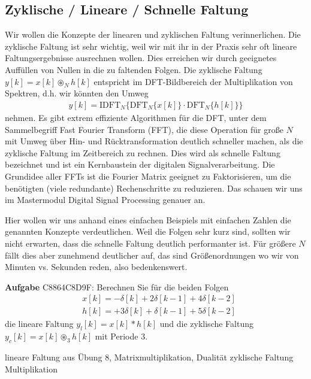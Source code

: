 \subsection{Zyklische / Lineare / Schnelle Faltung}
\label{sec:C8864C8D9F}
\begin{Ziel}
Wir wollen die Konzepte der linearen und zyklischen Faltung verinnerlichen.
Die zyklische Faltung ist sehr wichtig, weil wir mit ihr in der Praxis sehr
oft lineare Faltungsergebnisse ausrechnen wollen. Dies erreichen wir
durch geeignetes Auffüllen von Nullen in die zu faltenden Folgen.
Die zyklische Faltung $y[k] = x[k]\circledast_N h[k]$
entspricht im DFT-Bildbereich der Multiplikation von Spektren, d.h. wir könnten
den Umweg
\begin{align}
y[k] = \mathrm{IDFT}_N\{\mathrm{DFT}_N\{x[k]\} \cdot \mathrm{DFT}_N\{h[k]\}\}
\end{align}
nehmen. Es gibt extrem effiziente Algorithmen für die DFT,
unter dem Sammelbegriff Fast Fourier Transform (FFT), die diese Operation für
große $N$ mit Umweg über Hin- und Rücktransformation deutlich schneller machen,
als die zyklische Faltung im Zeitbereich zu rechnen. Dies wird als schnelle
Faltung bezeichnet und ist ein Kernbaustein der digitalen Signalverarbeitung.
Die Grundidee aller FFTs ist die Fourier Matrix geeignet zu Faktorisieren, um
die benötigten (viele redundante) Rechenschritte zu reduzieren. Das schauen
wir uns im Mastermodul Digital Signal Processing genauer an.

Hier wollen wir uns anhand eines einfachen Beispiels mit einfachen Zahlen die
genannten Konzepte verdeutlichen. Weil die Folgen sehr kurz sind, sollten wir
nicht erwarten, dass die schnelle Faltung deutlich performanter ist.
Für größere $N$ fällt dies aber zunehmend deutlicher auf, das sind Größenordnungen
wo wir von Minuten vs. Sekunden reden, also bedenkenswert.
\end{Ziel}
\textbf{Aufgabe} {\tiny C8864C8D9F}:
Berechnen Sie für die beiden Folgen
\begin{align}
&x[k] = -\delta[k] +2 \delta[k-1] + 4 \delta[k-2]\\
&h[k] = +3 \delta[k] + \delta[k-1] + 5 \delta[k-2]
\end{align}
die lineare Faltung $y_l[k] = x[k] \ast h[k]$ und die zyklische Faltung
$y_c[k] = x[k] \circledast_3 h[k]$
mit Periode $3$.
\begin{Werkzeug}
lineare Faltung aus Übung 8, Matrixmultiplikation, Dualität zyklische Faltung
Multiplikation
\end{Werkzeug}
